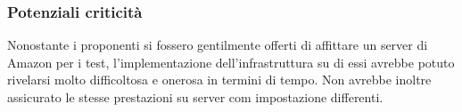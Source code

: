 \subsubsection{Potenziali criticità} 
Nonostante i proponenti si fossero gentilmente offerti di affittare un server di Amazon per i test, l’implementazione dell’infrastruttura su di essi avrebbe potuto rivelarsi molto difficoltosa e onerosa in termini di tempo. Non avrebbe inoltre assicurato le stesse prestazioni su server com impostazione differenti.

